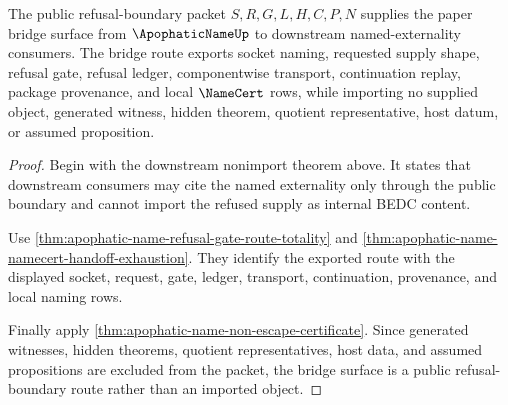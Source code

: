 \begin{theorem}
\label{thm:apophatic-name-bridge-route-scope}
The public refusal-boundary packet $S,R,G,L,H,C,P,N$ supplies the paper bridge surface from $\ApophaticNameUp$ to downstream named-externality consumers. The bridge route exports socket naming, requested supply shape, refusal gate, refusal ledger, componentwise transport, continuation replay, package provenance, and local $\NameCert$ rows, while importing no supplied object, generated witness, hidden theorem, quotient representative, host datum, or assumed proposition.
\end{theorem}
\begin{proof}
Begin with the downstream nonimport theorem above. It states that downstream consumers may cite the named externality only through the public boundary and cannot import the refused supply as internal BEDC content.

Use \autoref{thm:apophatic-name-refusal-gate-route-totality} and \autoref{thm:apophatic-name-namecert-handoff-exhaustion}. They identify the exported route with the displayed socket, request, gate, ledger, transport, continuation, provenance, and local naming rows.

Finally apply \autoref{thm:apophatic-name-non-escape-certificate}. Since generated witnesses, hidden theorems, quotient representatives, host data, and assumed propositions are excluded from the packet, the bridge surface is a public refusal-boundary route rather than an imported object.
\end{proof}


